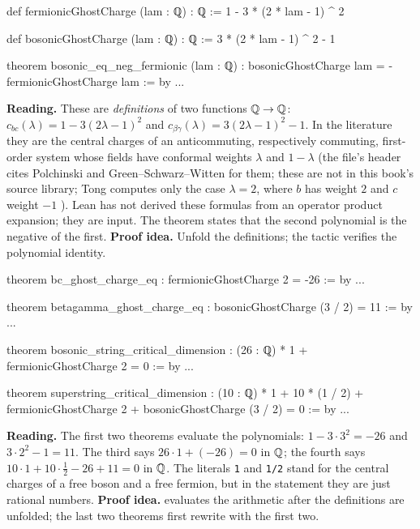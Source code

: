 \begin{leanbox}
\begin{leancode}
def fermionicGhostCharge (lam : ℚ) : ℚ := 1 - 3 * (2 * lam - 1) ^ 2

def bosonicGhostCharge (lam : ℚ) : ℚ := 3 * (2 * lam - 1) ^ 2 - 1

theorem bosonic_eq_neg_fermionic (lam : ℚ) :
    bosonicGhostCharge lam = - fermionicGhostCharge lam := by ...
\end{leancode}
\textbf{Reading.} These are \emph{definitions} of two functions $\mathbb{Q}\to\mathbb{Q}$:
$c_{bc}(\lambda)=1-3(2\lambda-1)^2$ and $c_{\beta\gamma}(\lambda)=3(2\lambda-1)^2-1$. In the
literature they are the central charges of an anticommuting, respectively commuting,
first-order system whose fields have conformal weights $\lambda$ and $1-\lambda$ (the file's
header cites Polchinski and Green--Schwarz--Witten for them; these are not in this book's
source library; Tong computes only the case $\lambda=2$, where $b$ has weight $2$ and $c$
weight $-1$ ). Lean has not derived these
formulas from an operator product expansion; they are input. The theorem states that the
second polynomial is the negative of the first. \textbf{Proof idea.} Unfold the definitions;
the tactic  verifies the polynomial identity.
\end{leanbox}

\begin{leanbox}
\begin{leancode}
theorem bc_ghost_charge_eq : fermionicGhostCharge 2 = -26 := by ...

theorem betagamma_ghost_charge_eq : bosonicGhostCharge (3 / 2) = 11 := by ...

theorem bosonic_string_critical_dimension :
    (26 : ℚ) * 1 + fermionicGhostCharge 2 = 0 := by ...

theorem superstring_critical_dimension :
    (10 : ℚ) * 1 + 10 * (1 / 2) + fermionicGhostCharge 2
      + bosonicGhostCharge (3 / 2) = 0 := by ...
\end{leancode}
\textbf{Reading.} The first two theorems evaluate the polynomials: $1-3\cdot3^2=-26$ and
$3\cdot2^2-1=11$. The third says $26\cdot1+(-26)=0$ in $\mathbb{Q}$; the fourth says
$10\cdot1+10\cdot\frac12-26+11=0$ in $\mathbb{Q}$. The literals \texttt{1} and \texttt{1/2} stand for
the central charges of a free boson and a free fermion, but in the statement they are just
rational numbers. \textbf{Proof idea.}  evaluates the arithmetic after the
definitions are unfolded; the last two theorems first rewrite with the first two.
\end{leanbox}

